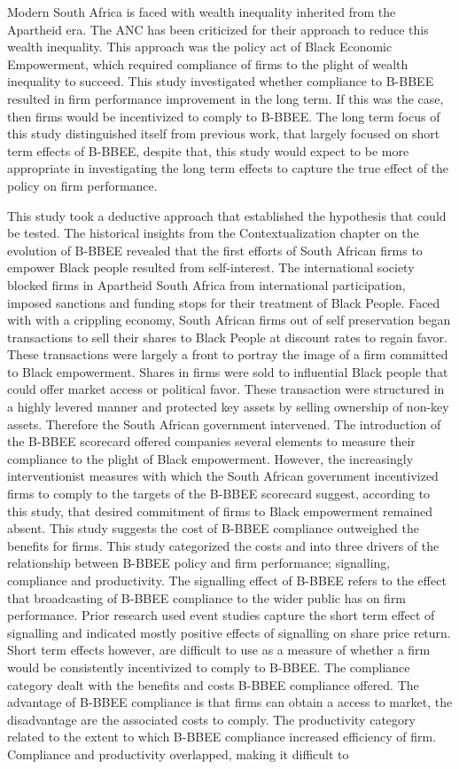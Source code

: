 Modern South Africa is faced with wealth inequality inherited from the Apartheid era. The ANC has been criticized for their approach to reduce this wealth inequality. This approach was the policy act of Black Economic Empowerment, which required compliance of firms to the plight of wealth inequality to succeed. This study investigated whether compliance to B-BBEE resulted in firm performance improvement in the long term. If this was the case, then firms would be incentivized to comply to B-BBEE. The long term focus of this study distinguished itself from previous work, that largely focused on short term effects of B-BBEE, despite that, this study would expect to be more appropriate in investigating the long term effects to capture the true effect of the policy on firm performance.

This study took a deductive approach that established the hypothesis that could be tested. The historical insights from the Contextualization chapter on the evolution of B-BBEE revealed that the first efforts of South African firms to empower Black people resulted from self-interest. The international society blocked firms in Apartheid South Africa from international participation, imposed sanctions and funding stops for their treatment of Black People. Faced with with a crippling economy, South African firms out of self preservation began transactions to sell their shares to Black People at discount rates to regain favor. These transactions were largely a front to portray the image of a firm committed to Black empowerment. Shares in firms were sold to influential Black people that could offer market access or political favor. These transaction were structured in a highly levered manner and protected key assets by selling ownership of non-key assets. Therefore the South African government intervened. The introduction of the B-BBEE scorecard offered companies several elements to measure their compliance to the plight of Black empowerment. However, the increasingly interventionist measures with which the South African government incentivized firms to comply to the targets of the B-BBEE scorecard suggest, according to this study, that desired commitment of firms to Black empowerment remained absent. This study suggests the cost of B-BBEE compliance outweighed the benefits for firms. This study categorized the costs and into three drivers of the relationship between B-BBEE policy and firm performance; signalling, compliance and productivity. The signalling effect of B-BBEE refers to the effect that broadcasting of B-BBEE compliance to the wider public has on firm performance. Prior research used event studies capture the short term effect of signalling and indicated mostly positive effects of signalling on share price return. Short term effects however, are difficult to use as a measure of whether a firm would be consistently incentivized to comply to B-BBEE. The compliance category dealt with the benefits and costs B-BBEE compliance offered. The advantage of B-BBEE compliance is that firms can obtain a access to market, the disadvantage are the associated costs to comply. The productivity category related to the extent to which B-BBEE compliance increased efficiency of firm. Compliance and productivity overlapped, making it difficult to 